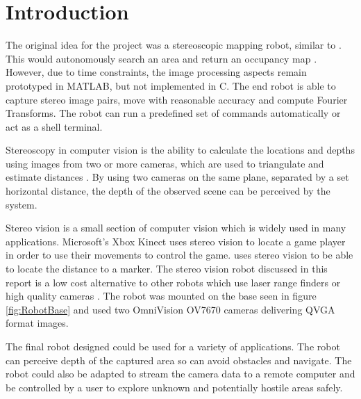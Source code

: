 \chapter{Introduction} \label{Chapter:Introduction}

%
%
%
%


The original idea for the project was a stereoscopic mapping robot, similar to \cite{Pirobot}. This would autonomously search an area and return an occupancy map \citep{thrun2003learning}. However, due to time constraints, the image processing aspects remain prototyped in MATLAB, but not implemented in C. The end robot is able to capture stereo image pairs, move with reasonable accuracy and compute Fourier Transforms. The robot can run a predefined set of commands automatically or act as a shell terminal.

Stereoscopy in computer vision is the ability to calculate the locations and depths using images from two or more cameras, which are used to triangulate and estimate distances \citep{Saxena:DepthEstimation}. By using two cameras on the same plane, separated by a set horizontal distance, the depth of the observed scene can be perceived by the system.

Stereo vision is a small section of computer vision which is widely used in many applications. Microsoft's Xbox Kinect \citep{Microsoft:Kinect} uses stereo vision to locate a game player in order to use their movements to control the game. \cite{Mrovlje:Distance_Stereoscopic} uses stereo vision to be able to locate the distance to a marker. 
The stereo vision robot discussed in this report is a low cost alternative to other robots which use laser range finders or high quality cameras \citep{Se:MappingRobot}. The robot was mounted on the base seen in figure \ref{fig:RobotBase} and used two OmniVision OV7670 cameras delivering QVGA format images.

The final robot designed could be used for a variety of applications. The robot can perceive depth of the captured area so can avoid obstacles and navigate. The robot could also be adapted to stream the camera data to a remote computer and be controlled by a user to explore unknown and potentially hostile areas safely. 

